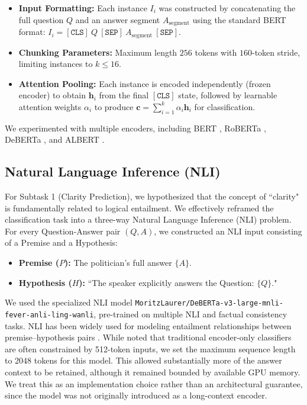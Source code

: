 \documentclass[11pt]{article}
\begin{document}
\begin{itemize}
    \item \textbf{Input Formatting:} Each instance $I_i$ was constructed by concatenating the full question $Q$ and an answer segment $A_{\text{segment}}$ using the standard BERT format: $I_i = [\texttt{CLS}] \ Q \ [\texttt{SEP}] \ A_{\text{segment}} \ [\texttt{SEP}]$.
    \item \textbf{Chunking Parameters:} Maximum length $256$ tokens with $160$-token stride, limiting instances to $k \le 16$.
    \item \textbf{Attention Pooling:} Each instance is encoded independently (frozen encoder) to obtain $\mathbf{h}_i$ from the final $[\texttt{CLS}]$ state, followed by learnable attention weights $\alpha_i$ to produce $\mathbf{c} = \sum_{i=1}^{k} \alpha_i \mathbf{h}_i$ for classification.

\end{itemize}

We experimented with multiple encoders, including BERT \citep{devlin2019bert}, RoBERTa \citep{liu2019roberta}, DeBERTa \citep{he2021deberta}, and ALBERT \citep{lan2020albert}.

\subsection{Natural Language Inference (NLI)}
For Subtask 1 (Clarity Prediction), we hypothesized that the concept of ``clarity" is fundamentally related to logical entailment. We effectively reframed the classification task into a three-way Natural Language Inference (NLI) problem. For every Question-Answer pair $(Q, A)$, we constructed an NLI input consisting of a Premise and a Hypothesis:

\begin{itemize}
    \item \textbf{Premise ($P$):} The politician's full answer $\{A\}$.
    \item \textbf{Hypothesis ($H$):} ``The speaker explicitly answers the Question: $\{Q\}$."
\end{itemize}

We used the specialized NLI model \texttt{MoritzLaurer/\allowbreak DeBERTa-v3-large-\allowbreak mnli-fever-anli-ling-wanli}, pre-trained on multiple NLI and factual consistency tasks. NLI has been widely used for modeling entailment relationships between premise--hypothesis pairs \citep{bowman2015large}. While \citet{b4} noted that traditional encoder-only classifiers are often constrained by 512-token inputs, we set the maximum sequence length to 2048 tokens for this model. This allowed substantially more of the answer context to be retained, although it remained bounded by available GPU memory. We treat this as an implementation choice rather than an architectural guarantee, since the model was not originally introduced as a long-context encoder.
\end{document}
